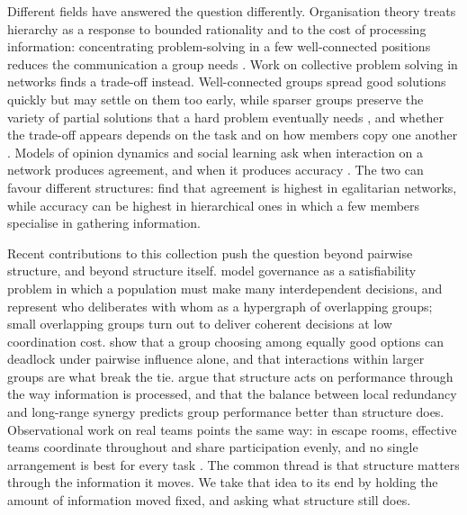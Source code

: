 \documentclass[11pt]{article}
\begin{document}
Different fields have answered the question differently. Organisation theory treats hierarchy as a response to bounded rationality and to the cost of processing information: concentrating problem-solving in a few well-connected positions reduces the communication a group needs \parencite{simon1962architecture, radner1993organization, bolton1994firm}. Work on collective problem solving in networks finds a trade-off instead. Well-connected groups spread good solutions quickly but may settle on them too early, while sparser groups preserve the variety of partial solutions that a hard problem eventually needs \parencite{lazer2007network, mason2008propagation, fang2010balancing}, and whether the trade-off appears depends on the task and on how members copy one another \parencite{shore2015facts, barkoczi2016social}. Models of opinion dynamics and social learning ask when interaction on a network produces agreement, and when it produces accuracy \parencite{bala1998learning, jackson2011overview, noorazar2020classical}. The two can favour different structures: \textcite{berekmeri2020optimal} find that agreement is highest in egalitarian networks, while accuracy can be highest in hierarchical ones in which a few members specialise in gathering information. 

Recent contributions to this collection push the question beyond pairwise structure, and beyond structure itself. \textcite{hebert2025governance} model governance as a satisfiability problem in which a population must make many interdependent decisions, and represent who deliberates with whom as a hypergraph of overlapping groups; small overlapping groups turn out to deliver coherent decisions at low coordination cost. \textcite{marchpons2026symmetry} show that a group choosing among equally good options can deadlock under pairwise influence alone, and that interactions within larger groups are what break the tie. \textcite{garg2026synergy} argue that structure acts on performance through the way information is processed, and that the balance between local redundancy and long-range synergy predicts group performance better than structure does. Observational work on real teams points the same way: in escape rooms, effective teams coordinate throughout and share participation evenly, and no single arrangement is best for every task \parencite{oszabo2026coordination}. The common thread is that structure matters through the information it moves. We take that idea to its end by holding the amount of information moved fixed, and asking what structure still does.
\end{document}
